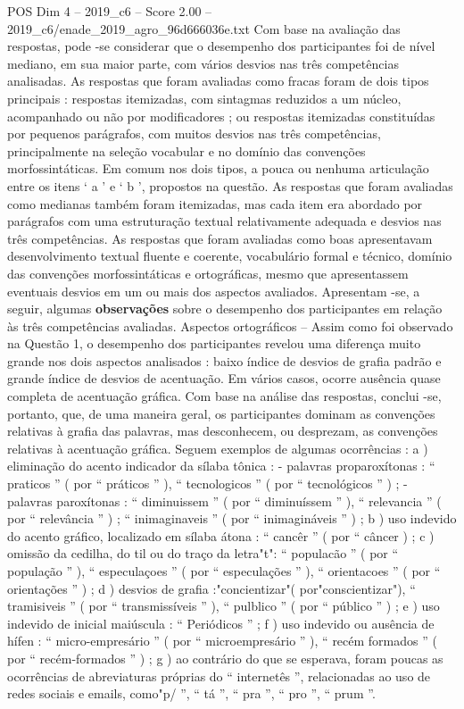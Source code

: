 \begin{textsample}{POS Dim 4 – 2019\_c6 – Score 2.00 – 2019\_c6/enade\_2019\_agro\_96d666036e.txt}
Com base na avaliação das respostas, pode -se considerar que o desempenho dos participantes foi de nível mediano, em sua maior parte, com vários desvios nas três competências analisadas.
As respostas que foram avaliadas como fracas foram de dois tipos principais : respostas itemizadas, com sintagmas reduzidos a um núcleo, acompanhado ou não por modificadores ; ou respostas itemizadas constituídas por pequenos parágrafos, com muitos desvios nas três competências, principalmente na seleção vocabular e no domínio das convenções morfossintáticas.
Em comum nos dois tipos, a pouca ou nenhuma articulação entre os itens ‘ a ’ e ‘ b ’, propostos na questão.
As respostas que foram avaliadas como medianas também foram itemizadas, mas cada item era abordado por parágrafos com uma estruturação textual relativamente adequada e desvios nas três competências.
As respostas que foram avaliadas como boas apresentavam desenvolvimento textual fluente e coerente, vocabulário formal e técnico, domínio das convenções morfossintáticas e ortográficas, mesmo que apresentassem eventuais desvios em um ou mais dos aspectos avaliados.
Apresentam -se, a seguir, algumas \textbf{observações} sobre o desempenho dos participantes em relação às três competências avaliadas.
Aspectos ortográficos – Assim como foi observado na Questão 1, o desempenho dos participantes revelou uma diferença muito grande nos dois aspectos analisados : baixo índice de desvios de grafia padrão e grande índice de desvios de acentuação.
Em vários casos, ocorre ausência quase completa de acentuação gráfica.
Com base na análise das respostas, conclui -se, portanto, que, de uma maneira geral, os participantes dominam as convenções relativas à grafia das palavras, mas desconhecem, ou desprezam, as convenções relativas à acentuação gráfica.
Seguem exemplos de algumas ocorrências : a ) eliminação do acento indicador da sílaba tônica : - palavras proparoxítonas : “ praticos ” ( por “ práticos ” ), “ tecnologicos ” ( por “ tecnológicos ” ) ; - palavras paroxítonas : “ diminuissem ” ( por “ diminuíssem ” ), “ relevancia ” ( por “ relevância ” ) ; “ inimaginaveis ” ( por “ inimagináveis ” ) ; b ) uso indevido do acento gráfico, localizado em sílaba átona : “ cancêr ” ( por “ câncer ) ; c ) omissão da cedilha, do til ou do traço da letra"t": “ populacão ” ( por “ população ” ), “ especulaçoes ” ( por “ especulações ” ), “ orientacoes ” ( por “ orientações ” ) ; d ) desvios de grafia :"concientizar"( por"conscientizar"), “ tramisiveis ” ( por “ transmissíveis ” ), “ pulblico ” ( por “ público ” ) ; e ) uso indevido de inicial maiúscula : “ Periódicos ” ; f ) uso indevido ou ausência de hífen : “ micro-empresário ” ( por “ microempresário ” ), “ recém formados ” ( por “ recém-formados ” ) ; g ) ao contrário do que se esperava, foram poucas as ocorrências de abreviaturas próprias do “ internetês ”, relacionadas ao uso de redes sociais e emails, como"p/ ”, “ tá ”, “ pra ”, “ pro ”, “ prum ”.

\end{textsample}
